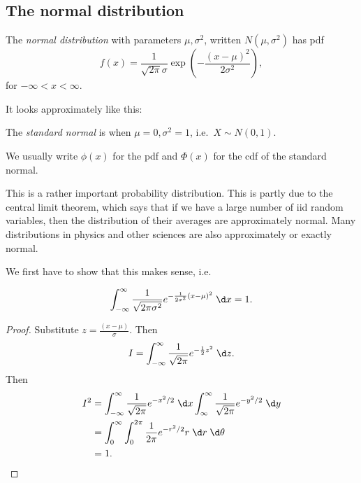 \documentclass[a4paper]{article}
\begin{document}
\subsection{The normal distribution}
\begin{defi}
  The \emph{normal distribution} with parameters $\mu, \sigma^2$, written $N(\mu, \sigma^2)$ has pdf
  \[
    f(x) = \frac{1}{\sqrt{2 \pi}\sigma}\exp\left(-\frac{(x - \mu)^2}{2\sigma^2}\right),
  \]
  for $-\infty < x < \infty$.

  It looks approximately like this:
  \begin{center}
  \end{center}
  The \emph{standard normal} is when $\mu = 0, \sigma^2 = 1$, i.e.\ $X\sim N(0, 1)$.

  We usually write $\phi(x)$ for the pdf and $\Phi(x)$ for the cdf of the standard normal.
\end{defi}
This is a rather important probability distribution. This is partly due to the central limit theorem, which says that if we have a large number of iid random variables, then the distribution of their averages are approximately normal. Many distributions in physics and other sciences are also approximately or exactly normal.

We first have to show that this makes sense, i.e.
\begin{prop}
  \[
    \int_{-\infty}^\infty \frac{1}{\sqrt{2\pi \sigma^2}} e^{-\frac{1}{2\sigma^2}(x - \mu)^2}\;\d x = 1.
  \]
\end{prop}
\begin{proof}
  Substitute $z = \frac{(x - \mu)}{\sigma}$. Then
  \[
    I = \int_{-\infty}^\infty \frac{1}{\sqrt{2\pi}}e^{-\frac{1}{2}z^2}\;\d z.
  \]
  Then
  \begin{align*}
    I^2 &= \int_{-\infty}^\infty \frac{1}{\sqrt{2\pi}} e^{-x^2/2}\;\d x\int_{\infty}^\infty \frac{1}{\sqrt{2\pi}} e^{-y^2/2}\;\d y\\
    &= \int_0^\infty \int_0^{2\pi}\frac{1}{2\pi}e^{-r^2/2}r\;\d r\;\d \theta\\
    &= 1.
  \end{align*}
\end{proof}
\end{document}
